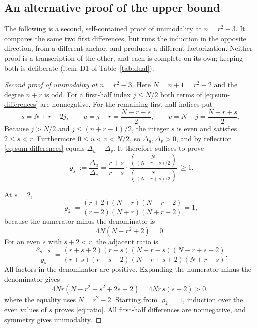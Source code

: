 \documentclass[11pt]{article}
\theoremstyle{research}
\theoremstyle{definition}
\numberwithin{equation}{section}
\begin{document}
\subsection{An alternative proof of the upper bound}
\label{sec:twoshift-alt}
The following is a second, self-contained proof of unimodality at
$n=r^2-3$. It compares the same two first differences, but runs the
induction in the opposite direction, from a different anchor, and produces
a different factorization. Neither proof is a transcription of the other,
and each is complete on its own; keeping both is deliberate (item~D1 of
Table~\ref{tab:dual}).

\begin{proof}[Second proof of unimodality at $n=r^2-3$]
Here $N=n+1=r^2-2$ and the degree $n+r$ is odd. For a first-half index
$j\le N/2$ both terms of \eqref{eq:sum-differences} are nonnegative. For
the remaining first-half indices put
\[
 s=N+r-2j,\qquad
 u=j-r=\frac{N-r-s}{2},\qquad
 v=N-j=\frac{N-r+s}{2} .
\]
Because $j>N/2$ and $j\le(n+r-1)/2$, the integer $s$ is even and satisfies
$2\le s<r$. Furthermore $0\le u<v<N/2$, so $\Delta_u,\Delta_v>0$, and by
reflection \eqref{eq:sum-differences} equals $\Delta_u-\Delta_v$.
It therefore suffices to prove
\begin{equation}\label{eq:ratio}
 \varrho_s:=\frac{\Delta_u}{\Delta_v}
 =\frac{r+s}{r-s}\cdot
   \frac{\binom N{(N-r-s)/2}}{\binom N{(N-r+s)/2}}
 \ \ge1 .
\end{equation}

At $s=2$,
\[
 \varrho_2=\frac{(r+2)(N-r)(N-r+2)}
                {(r-2)(N+r)(N+r+2)}=1,
\]
because the numerator minus the denominator is
\begin{equation}\label{eq:ratio-base}
 4N(N-r^2+2)=0 .
\end{equation}
For an even $s$ with $s+2<r$, the adjacent ratio is
\begin{equation}\label{eq:ratio-step}
 \frac{\varrho_{s+2}}{\varrho_s}
 =\frac{(r+s+2)(r-s)(N-r-s)(N-r+s+2)}
        {(r+s)(r-s-2)(N+r+s+2)(N+r-s)} .
\end{equation}
All factors in the denominator are positive. Expanding the numerator minus
the denominator gives
\begin{equation}\label{eq:ratio-positive}
 4Nr(N-r^2+s^2+2s+2)=4Nr\,s(s+2)>0,
\end{equation}
where the equality uses $N=r^2-2$. Starting from $\varrho_2=1$, induction
over the even values of $s$ proves \eqref{eq:ratio}. All first-half
differences are nonnegative, and symmetry gives unimodality.
\end{proof}
\end{document}
